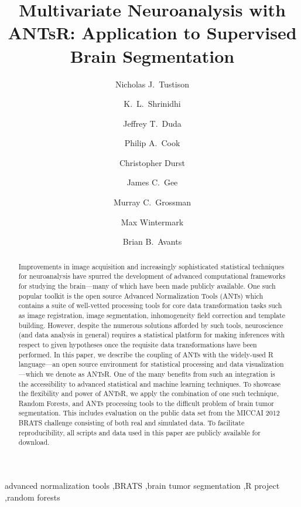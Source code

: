 \documentclass[final,5p,times,twocolumn]{elsarticle}
\begin{document}
\begin{frontmatter}

\title{Multivariate Neuroanalysis with ANTsR:  Application to Supervised Brain Segmentation}

\author[label1]{Nicholas J.~Tustison
  }
\author[label2]{K.~L.~Shrinidhi}
\author[label2]{Jeffrey T.~Duda}
\author[label2]{Philip A.~Cook}
\author[label1]{Christopher Durst}
\author[label1]{James C.~Gee}
\author[label1]{Murray C.~Grossman}
\author[label1]{Max Wintermark}
\author[label2]{Brian B.~Avants}
\address[label1]{Department of Radiology and Medical Imaging, University of Virginia, Charlottesville, VA}
\address[label2]{Penn Image Computing and Science Laboratory, University of Pennsylvania,
                Philadelphia, PA}


\linenumbers

\begin{abstract} 
Improvements in image acquisition and increasingly sophisticated statistical techniques 
for neuroanalysis have spurred the development of advanced computational frameworks for studying the
brain---many of which
have been made publicly available.  One such popular toolkit is the open source Advanced
Normalization Tools (ANTs) which contains a suite of well-vetted processing tools for
core data transformation tasks such as image registration, image segmentation, 
inhomogeneity field correction and template building.  However, despite the numerous
solutions afforded by such tools, neuroscience (and data analysis in general) requires
a statistical platform for making inferences with respect to given hypotheses once the 
requisite data transformations have been performed.  In this paper, we describe the
coupling of ANTs with the widely-used R language---an open source environment for 
statistical processing and data visualization---which we denote as ANTsR.  One of the
many benefits from such an integration is the accessibility to advanced statistical 
and machine learning techniques.  To showcase the flexibility and power of ANTsR, we 
apply the combination of one such technique, Random Forests, and ANTs processing 
tools to the difficult problem of brain tumor segmentation.  This includes evaluation on 
the public data set from the MICCAI 2012 BRATS challenge consisting of both real and simulated
data.  To facilitate reproducibility, all scripts and data used in this paper are 
publicly available for download.  
\end{abstract}

\begin{keyword}
advanced normalization tools \sep BRATS \sep brain tumor segmentation \sep R project \sep random forests
\end{keyword}

\end{frontmatter}
%
%
\newpage
\end{document}
